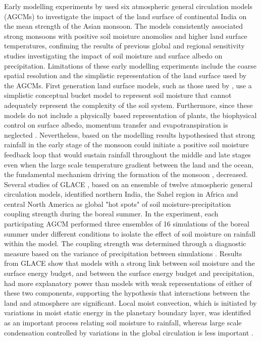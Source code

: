 \documentclass{icldt}\usepackage[]{graphicx}\usepackage[]{color}
\begin{document}
Early modelling experiments by \citet{Meehl1994} used six atmospheric general circulation models (AGCMs) to investigate the impact of the land surface of continental India on the mean strength of the Asian monsoon. The models consistently associated strong monsoons with positive soil moisture anomolies and higher land surface temperatures, confiming the results of previous global and regional sensitivity studies investigating the impact of soil moisture \citep{Walker1977,Shukla1982,Sud1985} and surface albedo \citep{Charney1977,Sud1985} on precipitation. Limitations of these early modelling experiments include the coarse spatial resolution and the simplistic representation of the land surface used by the AGCMs. First generation land surface models, such as those used by \citet{Meehl1994}, use a simplistic conceptual bucket model to represent soil moisture that cannot adequately represent the complexity of the soil system. Furthermore, since these models do not include a physically based representation of plants, the biophysical control on surface albedo, momentum transfer and evapotranspiration is neglected \citep{Sellers1997}. Nevertheless, based on the modelling results \citet{Meehl1994} hypothesised that strong rainfall in the early stage of the monsoon could initiate a positive soil moisture feedback loop that would sustain rainfall throughout the middle and late stages even when the large scale temperature gradient between the land and the ocean, the fundamental mechanism driving the formation of the monsoon \citep{Turner2012}, decreased. \\

Several studies of GLACE \citep{Koster2004,Koster2006,Guo2006}, based on an ensemble of twelve atmospheric general circulation models, identified northern India, the Sahel region in Africa and central North America as global "hot spots" of soil moisture-precipitation coupling strength during the boreal summer. In the experiment, each participating AGCM performed three ensembles of 16 simulations of the boreal summer under different conditions to isolate the effect of soil moisture on rainfall within the model. The coupling strength was determined through a diagnostic measure based on the variance of precipitation between simulations \citep{Koster2002}. Results from GLACE show that models with a strong link between soil moisture and the surface energy budget, and between the surface energy budget and precipitation, had more explanatory power than models with weak representations of either of these two components, supporting the hypothesis that interactions between the land and atmosphere are significant. Local moist convection, which is initiated by variations in moist static energy in the planetary boundary layer, was identified as an important process relating soil moisture to rainfall, whereas large scale condensation controlled by variations in the global circulation is less important \citep{Guo2006}. \\
\end{document}
